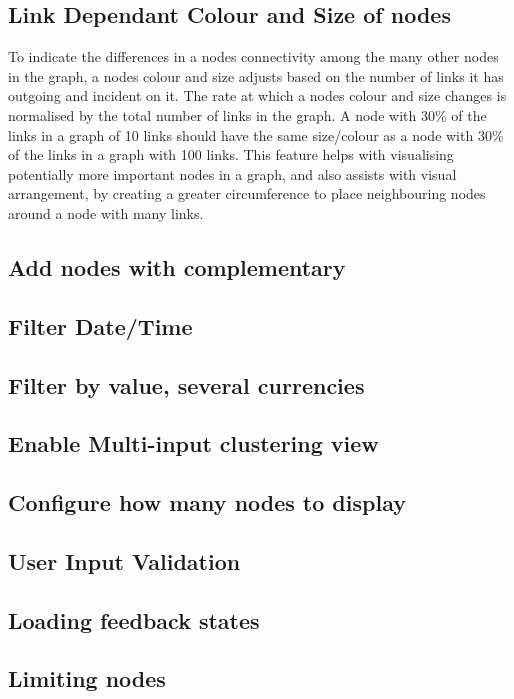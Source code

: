 \subsection{Link Dependant Colour and Size of nodes}
To indicate the differences in a nodes connectivity among the many other nodes in the graph, a nodes colour and size adjusts based on the number of links it has outgoing and incident on it. The rate at which a nodes colour and size changes is normalised by the total number of links in the graph. A node with 30\% of the links in a graph of 10 links should have the same size/colour as a node with 30\% of the links in a graph with 100 links. This feature helps with visualising potentially more important nodes in a graph, and also assists with visual arrangement, by creating a greater circumference to place neighbouring nodes around a node with many links.



\subsection{Add nodes with complementary}

\subsection{Filter Date/Time}

\subsection{Filter by value, several currencies}

\subsection{Enable Multi-input clustering view}

\subsection{Configure how many nodes to display}

\subsection{User Input Validation}

\subsection{Loading feedback states}

\subsection{Limiting nodes}

